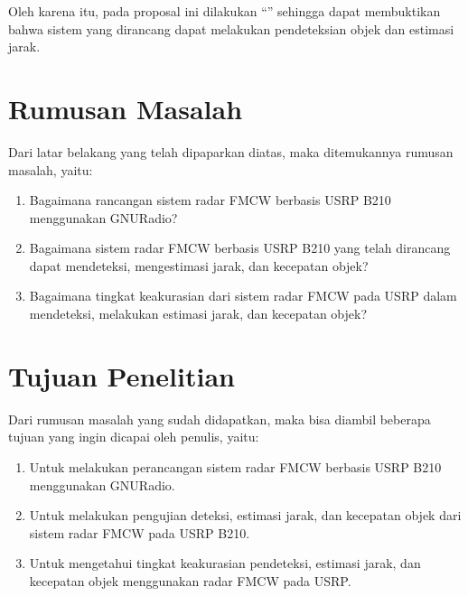 Oleh karena itu, pada proposal ini dilakukan “\judul” sehingga dapat membuktikan bahwa sistem yang dirancang dapat melakukan pendeteksian objek dan estimasi jarak.

\section{Rumusan Masalah}
Dari latar belakang yang telah dipaparkan diatas, maka ditemukannya rumusan masalah, yaitu:
\begin{enumerate}
	\item Bagaimana rancangan sistem radar FMCW berbasis USRP B210 menggunakan GNURadio? 
	\item Bagaimana sistem radar FMCW berbasis USRP B210 yang telah dirancang dapat mendeteksi, mengestimasi jarak, dan kecepatan objek?
	\item Bagaimana tingkat keakurasian dari sistem radar FMCW pada USRP dalam mendeteksi, melakukan estimasi jarak, dan kecepatan objek?
\end{enumerate} 

\section{Tujuan Penelitian}
Dari rumusan masalah yang sudah didapatkan, maka bisa diambil beberapa tujuan yang ingin dicapai oleh penulis, yaitu:

\begin{enumerate}
	\item Untuk melakukan perancangan sistem radar FMCW berbasis USRP B210 menggunakan GNURadio.
	\item Untuk melakukan pengujian deteksi, estimasi jarak, dan kecepatan objek dari sistem radar FMCW pada USRP B210.
	\item Untuk mengetahui tingkat keakurasian pendeteksi, estimasi jarak, dan kecepatan objek menggunakan radar FMCW pada USRP.
\end{enumerate}

